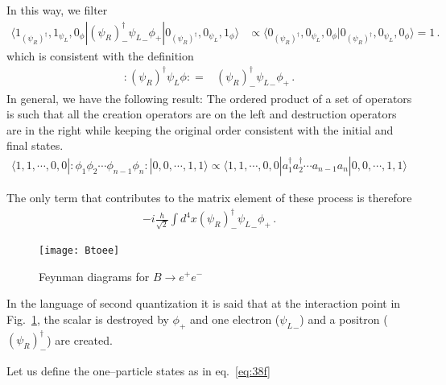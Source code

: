 \begin{frame}
In this way, we filter
\begin{align}
  \langle1_{(\psi_R)^{\dagger}},1_{{\psi_L}},0_{\phi}|(\psi_R)^{\dagger}_{-}{\psi_L}_{-}\phi_{+}|0_{(\psi_R)^{\dagger}},0_{{\psi_L}},1_{\phi}\rangle  &\propto  \langle0_{(\psi_R)^{\dagger}},0_{{\psi_L}},0_{\phi}|0_{(\psi_R)^{\dagger}},0_{{\psi_L}},0_{\phi}\rangle =1\,.
\end{align}
which is consistent with the definition
\begin{align}
:(\psi_R)^{\dagger}{\psi_L}\phi: =&(\psi_R)^{\dagger}_{-}{\psi_L}_{-}\phi_{+}\,.
\end{align}
In general, we have the following result: The ordered product of a set of operators is such that all the creation operators are on the left and destruction operators are in the right while keeping the original order consistent with the initial and final states.
\begin{align}
\langle 1,1,\cdots,0,0|  :\phi_1 \phi_2 \cdots \phi_{n-1}\phi_n:|0,0,\cdots,1,1\rangle
\propto \langle 1,1,\cdots,0,0| a_1^{\dagger} a_2^{\dagger}\cdots a_{n-1}a_n|0,0,\cdots,1,1\rangle
\end{align}


The only term that contributes to the matrix element of these process is therefore
\begin{align}
  \label{eq:97f}
  -i \frac{h}{\sqrt{2}} \int d^4x(\psi_R)^{\dagger}_-{\psi_L}_-\phi_+\,.
\end{align}

\begin{figure} %
  \centering %
  \texttt{[image: Btoee]} %
  \caption{Feynman diagrams for $B\to e^+ e^-$} %
  \label{fig:btoee} %
\end{figure} %
In the language of second quantization it is said that at the interaction point in Fig.~\ref{fig:btoee}, the scalar is destroyed by $\phi_+$ and one electron (${\psi_L}_-$) and a positron ($(\psi_R)^{\dagger}_{-}$) are created.

Let us define the one--particle states as in eq.~\eqref{eq:38f}


\end{frame}
